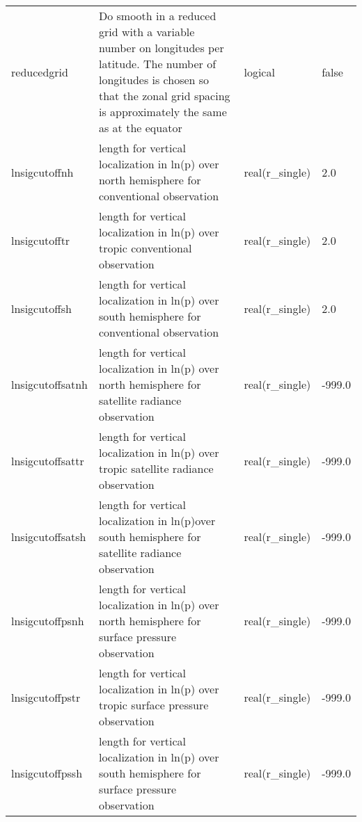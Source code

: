 \begin{table}[htbp]
\begin{tabular}{p{3cm}p{7cm}p{2.5cm}p{1.5cm}}
    reducedgrid & Do smooth in a reduced grid with a variable number 
on longitudes per latitude. The number of longitudes is chosen so that the zonal grid
spacing is approximately the same as at the equator & logical & false \\
lnsigcutoffnh & length for vertical localization in ln(p) over north hemisphere for conventional observation&real(r\_single)& 2.0\\
lnsigcutofftr &length for vertical localization in ln(p) over tropic conventional observation&real(r\_single)&2.0\\
lnsigcutoffsh &length for vertical localization in ln(p) over south hemisphere for conventional observation&real(r\_single) &2.0\\
lnsigcutoffsatnh &length for vertical localization in ln(p) over north hemisphere for satellite radiance observation&real(r\_single)& -999.0\\
 lnsigcutoffsattr &length for vertical localization in ln(p) over tropic satellite radiance observation&real(r\_single)& -999.0\\
 lnsigcutoffsatsh  &length for vertical localization in ln(p)over south hemisphere for satellite radiance observation&real(r\_single) &-999.0\\
 lnsigcutoffpsnh&length for vertical localization in ln(p) over north hemisphere for surface pressure observation&real(r\_single) &-999.0\\
  lnsigcutoffpstr &length for vertical localization in ln(p) over tropic surface pressure observation&real(r\_single)& -999.0\\
  lnsigcutoffpssh &length for vertical localization in ln(p) over south hemisphere for surface pressure observation&real(r\_single) &-999.0\\
\hline
\end{tabular}
\end{table} 



 
         
